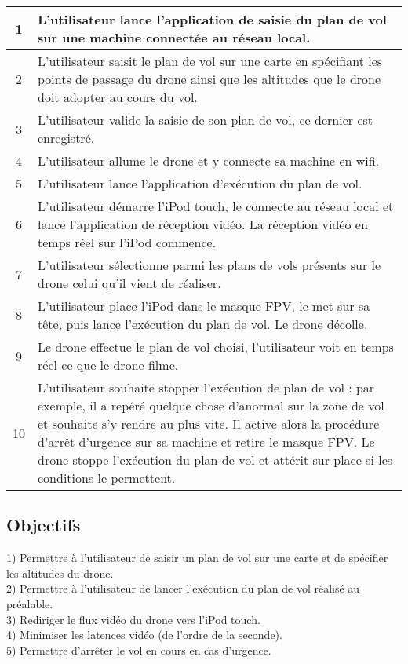 \documentclass{article}
\begin{document}
	    \begin{center}
        \begin{tabularx}{15cm}{|c|X|}
            \hline
            1 & L'utilisateur lance l'application de saisie du plan de vol sur une machine connectée au réseau local.\\
            \hline
            2 & L'utilisateur saisit le plan de vol sur une carte en spécifiant les points de passage du drone ainsi que les altitudes que le drone doit adopter au cours du vol. \\
            \hline
            3 & L'utilisateur valide la saisie de son plan de vol, ce dernier est enregistré. \\
            \hline
            4 & L'utilisateur allume le drone et y connecte sa machine en wifi. \\
            \hline
            5 & L'utilisateur lance l'application d'exécution du plan de vol. \\
            \hline
            6 &  L'utilisateur démarre l'iPod touch, le connecte au réseau local et lance l'application de réception vidéo. La réception vidéo en temps réel sur l'iPod commence.\\
            \hline
            7 & L'utilisateur sélectionne parmi les plans de vols présents sur le drone celui qu'il vient de réaliser. \\
            \hline
            8 & L'utilisateur place l'iPod dans le masque FPV, le met sur sa tête, puis lance l'exécution du plan de vol. Le drone décolle. \\
            \hline
            9 & Le drone effectue le plan de vol choisi, l'utilisateur voit en temps réel ce que le drone filme. \\
            \hline
            10 & L'utilisateur souhaite stopper l'exécution de plan de vol : par exemple, il a repéré quelque chose d'anormal sur la zone de vol et souhaite s'y rendre au plus vite. Il active alors la procédure d'arrêt d'urgence sur sa machine et retire le masque FPV. Le drone stoppe l'exécution du plan de vol et attérit sur place si les conditions le permettent. \\
            \hline
        \end{tabularx}
        \end{center}
	\subsection{Objectifs}
		1) Permettre à l'utilisateur de saisir un plan de vol sur une carte et de spécifier les altitudes du drone.\\
		2) Permettre à l'utilisateur de lancer l'exécution du plan de vol réalisé au préalable.\\
		3) Rediriger le flux vidéo du drone vers l'iPod touch. \\
		4) Minimiser les latences vidéo (de l'ordre de la seconde).\\
		5) Permettre d'arrêter le vol en cours en cas d'urgence.\\
\end{document}
